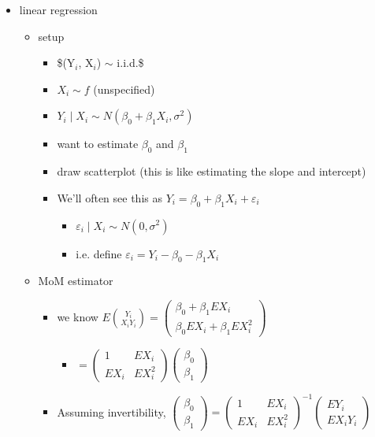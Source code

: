 \documentclass[11pt]{article}
\begin{document}
\begin{itemize}
\begin{itemize}
\begin{itemize}
\end{itemize}
\end{itemize}
\item linear regression
\begin{itemize}
\item setup
\begin{itemize}
\item \$(Y$_i$, X$_i$) $\sim$ i.i.d.\$
\item $X_i \sim f$ (unspecified)
\item $Y_i \mid X_i \sim N(\beta_0 + \beta_1 X_i, \sigma^2)$
\item want to estimate $\beta_0$ and $\beta_1$
\item draw scatterplot (this is like estimating the slope and intercept)
\item We'll often see this as $Y_i = \beta_0 + \beta_1 X_i + \varepsilon_i$
\begin{itemize}
\item $\varepsilon_i \mid X_i \sim N(0, \sigma^2)$
\item i.e. define $\varepsilon_i = Y_i - \beta_0 - \beta_1 X_i$
\end{itemize}
\end{itemize}
\item MoM estimator
\begin{itemize}
\item we know $E \binom{Y_i}{X_i Y_i} = \begin{pmatrix} \beta_0 + \beta_1 E X_i \\ \beta_0 E X_i + \beta_1 E X_i^2 \end{pmatrix}$
\begin{itemize}
\item $= \begin{pmatrix} 1 & E X_i \\ E X_i & E X_i^2 \end{pmatrix} \begin{pmatrix}\beta_0 \\ \beta_1\end{pmatrix}$
\end{itemize}
\item Assuming invertibility, $\begin{pmatrix}\beta_0\\\beta_1\end{pmatrix} = \begin{pmatrix}1&EX_i\\EX_i&EX_i^2\end{pmatrix}^{-1} \begin{pmatrix}EY_i\\EX_iY_i\end{pmatrix}$

\end{itemize}
\end{itemize}
\end{itemize}
\end{document}
